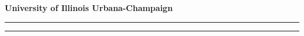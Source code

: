 \documentclass[a4paper,12pt]{article}
\begin{document}
\pagestyle{fancy}
\thispagestyle{empty}
\fancyhead[L]{}
\renewcommand*{\thefootnote}{\fnsymbol{footnote}}
\begin{center}
\Large{\textbf{University of Illinois Urbana-Champaign}}
\vspace{0.4cm}
\normalsize
\textit{}
\medskip
\normalsize
\end{center}
{\color{gray}\hrule}
\vspace{0.4cm}

{\color{gray}\hrule}
\medskip
\newpage

\newpage
\tableofcontents
\newpage

\newpage

\newpage

\newpage

\newpage

\newpage

\newpage

\newpage


\end{document}
